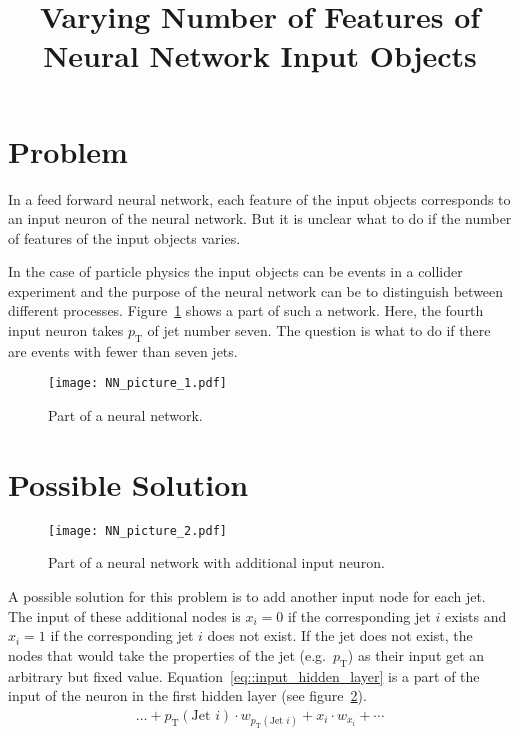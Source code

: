 \documentclass[12pt,a4paper]{article}
\title{Varying Number of Features of Neural Network Input Objects}
\author{}
\date{}
\begin{document}
\maketitle

\section{Problem}

In a feed forward neural network, each feature of the input objects corresponds to an input neuron of the neural network. But it is unclear what to do if the number of features of the input objects varies.

In the case of particle physics the input objects can be events in a collider experiment and the purpose of the neural network can be to distinguish between different processes. Figure~\ref{fig::NN_picture_1} shows a part of such a network. Here, the fourth input neuron takes $p_\text{T}$ of jet number seven. The question is what to do if there are events with fewer than seven jets.


\begin{figure}
\begin{center}
\texttt{[image: NN\_picture\_1.pdf]}
\caption{Part of a neural network.}
\label{fig::NN_picture_1}
\end{center}
\end{figure}


\section{Possible Solution}
\label{sec::Possible_solution}

\begin{figure}
\begin{center}
\texttt{[image: NN\_picture\_2.pdf]}
\caption{Part of a neural network with additional input neuron.}
\label{fig::NN_picture_2}
\end{center}
\end{figure}

A possible solution for this problem is to add another input node for each jet. The input of these additional nodes is $x_i = 0$ if the corresponding jet $i$ exists and $x_i = 1$ if the corresponding jet $i$ does not exist. If the jet does not exist, the nodes that would take the properties of the jet (e.g.\ $p_\text{T}$) as their input get an arbitrary but fixed value. Equation~\eqref{eq::input_hidden_layer} is a part of the input of the neuron in the first hidden layer (see figure~\ref{fig::NN_picture_2}).
\begin{align}
\dots + p_\text{T}(\text{Jet }i) \cdot w_{p_\text{T}(\text{Jet }i)} + x_i \cdot w_{x_i} + \dotsb \label{eq::input_hidden_layer}
\end{align}
\end{document}
